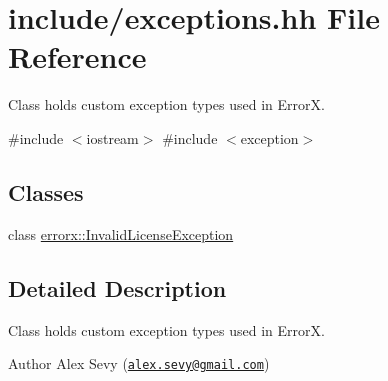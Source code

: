 \hypertarget{exceptions_8hh}{}\section{include/exceptions.hh File Reference}
\label{exceptions_8hh}


Class holds custom exception types used in ErrorX.  


{\ttfamily \#include $<$iostream$>$}\newline
{\ttfamily \#include $<$exception$>$}\newline
\subsection*{Classes}
\begin{DoxyCompactItemize}
\item 
class \mbox{\hyperlink{classerrorx_1_1_invalid_license_exception}{errorx\+::\+Invalid\+License\+Exception}}
\end{DoxyCompactItemize}


\subsection{Detailed Description}
Class holds custom exception types used in ErrorX. 

\begin{DoxyAuthor}{Author}
Alex Sevy (\href{mailto:alex.sevy@gmail.com}{\tt alex.\+sevy@gmail.\+com}) 
\end{DoxyAuthor}
